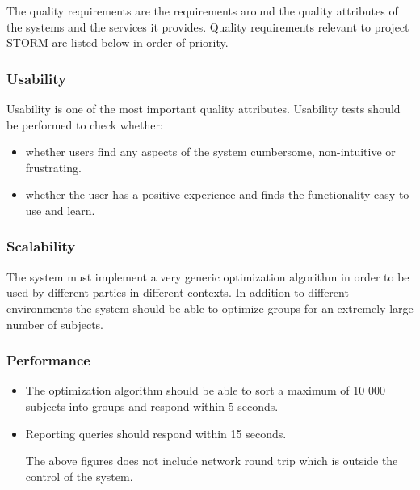 The quality requirements are the requirements around the quality attributes of the systems and
the services it provides. Quality requirements relevant to project STORM are listed below in order of priority. \par

\subsubsection{Usability}
Usability is one of the most important quality attributes. Usability tests should be performed to check whether:
\begin{itemize}
\item whether users find any aspects of the system cumbersome, non-intuitive or frustrating.
\item whether the user has a positive experience and finds the functionality easy to use and learn.
\end{itemize}

\subsubsection{Scalability}
The system must implement a very generic optimization algorithm in order to be used by different parties in different contexts. In addition to different environments the system should be able to optimize groups for an extremely large number of subjects.

\subsubsection{Performance}
\begin{itemize}
\item The optimization algorithm should be able to sort a maximum of 10 000 subjects into groups and respond within 5 seconds.
\item Reporting queries should respond within 15 seconds. \par
The above figures does not include network round trip which is outside the control of the system.
\end{itemize}

